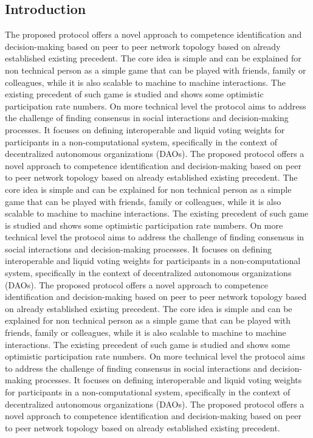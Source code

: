 \documentclass{article}
\begin{document}
\begin{multicols}{2}
\section{Introduction}
The proposed protocol offers a novel approach to competence identification and decision-making based on peer to peer network topology based on already established existing precedent.
The core idea is simple and can be explained for non technical person as a simple game that can be played with friends, family or colleagues, while it is also scalable to machine to machine interactions.  The existing precedent of such game is studied and shows some optimistic participation rate numbers.
On more technical level the protocol aims to address the challenge of finding consensus in social interactions and decision-making processes. It focuses on defining interoperable and liquid voting weights for participants in a non-computational system, specifically in the context of decentralized autonomous organizations (DAOs).    The proposed protocol offers a novel approach to competence identification and decision-making based on peer to peer network topology based on already established existing precedent.
The core idea is simple and can be explained for non technical person as a simple game that can be played with friends, family or colleagues, while it is also scalable to machine to machine interactions.  The existing precedent of such game is studied and shows some optimistic participation rate numbers.
On more technical level the protocol aims to address the challenge of finding consensus in social interactions and decision-making processes. It focuses on defining interoperable and liquid voting weights for participants in a non-computational system, specifically in the context of decentralized autonomous organizations (DAOs).    The proposed protocol offers a novel approach to competence identification and decision-making based on peer to peer network topology based on already established existing precedent.
The core idea is simple and can be explained for non technical person as a simple game that can be played with friends, family or colleagues, while it is also scalable to machine to machine interactions.  The existing precedent of such game is studied and shows some optimistic participation rate numbers.
On more technical level the protocol aims to address the challenge of finding consensus in social interactions and decision-making processes. It focuses on defining interoperable and liquid voting weights for participants in a non-computational system, specifically in the context of decentralized autonomous organizations (DAOs).    The proposed protocol offers a novel approach to competence identification and decision-making based on peer to peer network topology based on already established existing precedent.

\end{multicols}
\end{document}
